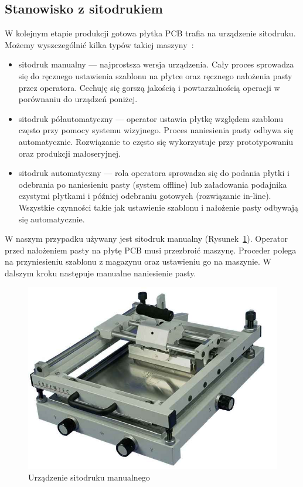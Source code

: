 \subsection{Stanowisko z sitodrukiem}
W kolejnym etapie produkcji gotowa płytka PCB trafia na urządzenie sitodruku.
Możemy wyszczególnić kilka typów takiej maszyny~\cite{sitodruk}:
\begin{itemize}
	\item sitodruk manualny --- najprostsza wersja urządzenia. Cały proces sprowadza się do ręcznego ustawienia szablonu na płytce oraz ręcznego nałożenia pasty przez operatora. Cechuję się gorszą jakością i powtarzalnością operacji w porównaniu do urządzeń poniżej.
	\item sitodruk półautomatyczny --- operator ustawia płytkę względem szablonu często przy pomocy systemu wizyjnego. Proces naniesienia pasty odbywa się automatycznie. Rozwiązanie to często się wykorzystuje przy prototypowaniu oraz produkcji małoseryjnej.
	\item sitodruk automatyczny --- rola operatora sprowadza się do podania płytki i odebrania po naniesieniu pasty (system offline) lub załadowania podajnika czystymi płytkami i później odebraniu gotowych (rozwiązanie in-line). Wszystkie czynności takie jak ustawienie szablonu i nałożenie pasty odbywają się automatycznie.
\end{itemize}

W naszym przypadku używany jest sitodruk manualny (Rysunek~\ref{sitodruk}). Operator przed nałożeniem pasty na płytę PCB musi przezbroić maszynę. Proceder polega na przyniesieniu szablonu z magazynu oraz ustawieniu go na maszynie. W dalszym kroku następuje manualne naniesienie pasty.

\begin{figure}[H]
	\centering
	\includegraphics[scale=0.25]{./chapters/chapter2/sitodruk.jpg}
	\caption{Urządzenie sitodruku manualnego~\cite{sitodruk}}
	\label{sitodruk}
\end{figure}

